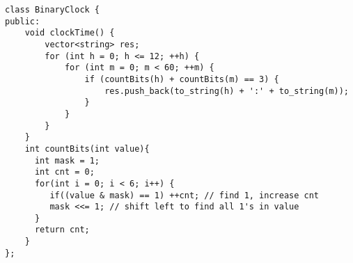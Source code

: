 \begin{lstlisting}
class BinaryClock {
public:
    void clockTime() {
        vector<string> res;
        for (int h = 0; h <= 12; ++h) {
            for (int m = 0; m < 60; ++m) {
                if (countBits(h) + countBits(m) == 3) {
                    res.push_back(to_string(h) + ':' + to_string(m));
                }
            }
        }
    }
    int countBits(int value){
      int mask = 1;
      int cnt = 0;
      for(int i = 0; i < 6; i++) {
         if((value & mask) == 1) ++cnt; // find 1, increase cnt
         mask <<= 1; // shift left to find all 1's in value
      }
      return cnt;       
    }
};
\end{lstlisting}